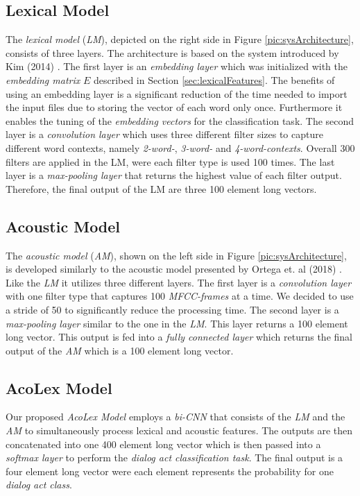 \documentclass[11pt,a4paper]{article}
\begin{document}
\subsection{Lexical Model}
The \textit{lexical model} (\textit{LM}), depicted on the right side in Figure \ref{pic:sysArchitecture}, consists of three layers. The architecture is based on the system introduced by Kim (2014) \cite{Kim_2014}. The first layer is an \textit{embedding layer} which was initialized with the \textit{embedding matrix} $E$ described in Section \ref{sec:lexicalFeatures}. The benefits of using an embedding layer is a significant reduction of the time needed to import the input files due to storing the vector of each word only once. Furthermore it enables the tuning of the \textit{embedding vectors} for the classification task. The second layer is a \textit{convolution layer} which uses three different filter sizes to capture different word contexts, namely \textit{2-word-}, \textit{3-word-} and \textit{4-word-contexts}. Overall 300 filters are applied in the LM, were each filter type is used 100 times. The last layer is a \textit{max-pooling layer} that returns the highest value of each filter output. Therefore, the final output of the LM are three 100 element long vectors.

\subsection{Acoustic Model}
The \textit{acoustic model} (\textit{AM}), shown on the left side in Figure \ref{pic:sysArchitecture}, is developed similarly to the acoustic model presented by Ortega et. al (2018) \cite{OrtegaVu_2018}. Like the \textit{LM} it utilizes three different layers. The first layer is a \textit{convolution layer} with one filter type that captures 100 \textit{MFCC-frames} at a time. We decided to use a stride of 50 to significantly reduce the processing time. The second layer is a \textit{max-pooling layer} similar to the one in the \textit{LM}. This layer returns a 100 element long vector. This output is fed into a \textit{fully connected layer} which returns the final output of the \textit{AM} which is a 100 element long vector.

\subsection{AcoLex Model}
Our proposed \textit{AcoLex Model} employs a \textit{bi-CNN} that consists of the \textit{LM} and the \textit{AM} to simultaneously process lexical and acoustic features. The outputs are then concatenated into one 400 element long vector which is then passed into a \textit{softmax layer} to perform the \textit{dialog act classification task}. The final output is a four element long vector were each element represents the probability for one \textit{dialog act class}.
\end{document}
